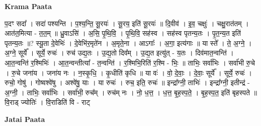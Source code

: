 \documentclass[17pt]{extarticle}
\begin{document}
\textbf{Krama Paata} \newline

प॒दꣳ सदा᳚ । सदा॑ पश्यन्ति । प॒श्य॒न्ति॒ सू॒रयः॑ । सू॒रय॒ इति॑ सू॒रयः॑ ॥ दि॒वीव॑ । इ॒व॒ चक्षुः॑ । चक्षु॒रात॑तम् । आत॑त॒मित्या - त॒त॒म् ॥ ध्रु॒वाऽसि॑ । अ॒सि॒ पृ॒थि॒वि॒ । पृ॒थि॒वि॒ सह॑स्व । सह॑स्व पृतन्य॒तः । पृ॒त॒न्य॒त इति॑ पृतन्य॒तः ॥? स्यू॒ता दे॒वेभिः॑ । दे॒वेभि॑र॒मृते॑न । अ॒मृते॒ना । आऽगाः᳚ । अ॒गा॒ इत्य॑गाः ॥ या स्ते᳚ । ते॒ अ॒ग्ने॒ । अ॒ग्ने॒ सूर्ये᳚ । सूर्ये॒ रुचः॑ । रुच॑ उद्य॒तः । उ॒द्य॒तो दिव᳚म् । उ॒द्य॒त इत्यु॑त् - य॒तः । दिव॑मात॒न्वन्ति॑ । आ॒त॒न्वन्ति॑ र॒श्मिभिः॑ । आ॒त॒न्वन्तीत्या᳚ - त॒न्वन्ति॑ । र॒श्मिभि॒रिति॑ र॒श्मि - भिः॒ ॥ ताभिः॒ सर्वा॑भिः । सर्वा॑भी रु॒चे । रु॒चे जना॑य । जना॑य नः । न॒स्कृ॒धि॒ । कृ॒धीति॑ कृधि ॥ या वः॑ । वो॒ दे॒वाः॒ । दे॒वाः॒ सूर्ये᳚ । सूर्ये॒ रुचः॑ । रुचो॒ गोषु॑ । गोष्वश्वे॑षु । अश्वे॑षु॒ याः । या रुचः॑ । रुच॒ इति॒ रुचः॑ ॥ इन्द्रा᳚ग्नी॒ ताभिः॑ । इन्द्रा᳚ग्नी॒ इतीन्द्र॑ - अ॒ग्नी॒ । ताभिः॒ सर्वा॑भिः । सर्वा॑भी॒ रुच᳚म् । रुच॑म् नः । नो॒ ध॒त्त॒ । ध॒त्त॒ बृ॒ह॒स्प॒ते॒ । बृ॒ह॒स्प॒त॒ इति॑ बृहस्पते ॥ वि॒राड् ज्योतिः॑ । वि॒राडिति॑ वि - राट् \newline

\textbf{Jatai Paata} \newline
\end{document}
